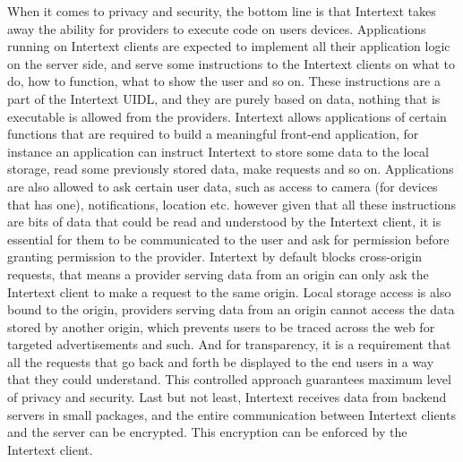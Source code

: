 When it comes to privacy and security, the bottom line is that Intertext takes away the ability for providers to execute code on users devices. Applications running on Intertext clients are expected to implement all their application logic on the server side, and serve some instructions to the Intertext clients on what to do, how to function, what to show the user and so on. These instructions are a part of the Intertext UIDL, and they are purely based on data, nothing that is executable is allowed from the providers. Intertext allows applications of certain functions that are required to build a meaningful front-end application, for instance an application can instruct Intertext to store some data to the local storage, read some previously stored data, make requests and so on. Applications are also allowed to ask certain user data, such as access to camera (for devices that has one), notifications, location etc. however given that all these instructions are bits of data that could be read and understood by the Intertext client, it is essential for them to be communicated to the user and ask for permission before granting permission to the provider. Intertext by default blocks cross-origin requests, that means a provider serving data from an origin can only ask the Intertext client to make a request to the same origin. Local storage access is also bound to the origin, providers serving data from an origin cannot access the data stored by another origin, which prevents users to be traced across the web for targeted advertisements and such. And for transparency, it is a requirement that all the requests that go back and forth be displayed to the end users in a way that they could understand. This controlled approach guarantees maximum level of privacy and security. Last but not least, Intertext receives data from backend servers in small packages, and the entire communication between Intertext clients and the server can be encrypted. This encryption can be enforced by the Intertext client.

